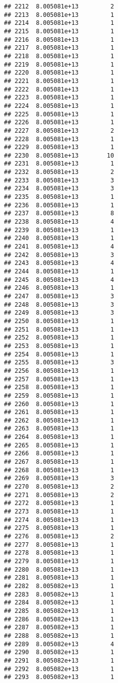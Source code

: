 \documentclass[
]{article}
\begin{document}
\begin{verbatim}
## 2212  8.005081e+13         2
## 2213  8.005081e+13         1
## 2214  8.005081e+13         1
## 2215  8.005081e+13         1
## 2216  8.005081e+13         1
## 2217  8.005081e+13         1
## 2218  8.005081e+13         1
## 2219  8.005081e+13         1
## 2220  8.005081e+13         1
## 2221  8.005081e+13         1
## 2222  8.005081e+13         1
## 2223  8.005081e+13         1
## 2224  8.005081e+13         1
## 2225  8.005081e+13         1
## 2226  8.005081e+13         1
## 2227  8.005081e+13         2
## 2228  8.005081e+13         1
## 2229  8.005081e+13         1
## 2230  8.005081e+13        10
## 2231  8.005081e+13         1
## 2232  8.005081e+13         2
## 2233  8.005081e+13         3
## 2234  8.005081e+13         3
## 2235  8.005081e+13         1
## 2236  8.005081e+13         1
## 2237  8.005081e+13         8
## 2238  8.005081e+13         4
## 2239  8.005081e+13         1
## 2240  8.005081e+13         1
## 2241  8.005081e+13         4
## 2242  8.005081e+13         3
## 2243  8.005081e+13         4
## 2244  8.005081e+13         1
## 2245  8.005081e+13         4
## 2246  8.005081e+13         1
## 2247  8.005081e+13         3
## 2248  8.005081e+13         3
## 2249  8.005081e+13         3
## 2250  8.005081e+13         1
## 2251  8.005081e+13         1
## 2252  8.005081e+13         1
## 2253  8.005081e+13         1
## 2254  8.005081e+13         1
## 2255  8.005081e+13         3
## 2256  8.005081e+13         1
## 2257  8.005081e+13         1
## 2258  8.005081e+13         1
## 2259  8.005081e+13         1
## 2260  8.005081e+13         1
## 2261  8.005081e+13         1
## 2262  8.005081e+13         1
## 2263  8.005081e+13         1
## 2264  8.005081e+13         1
## 2265  8.005081e+13         1
## 2266  8.005081e+13         1
## 2267  8.005081e+13         1
## 2268  8.005081e+13         1
## 2269  8.005081e+13         3
## 2270  8.005081e+13         2
## 2271  8.005081e+13         2
## 2272  8.005081e+13         1
## 2273  8.005081e+13         1
## 2274  8.005081e+13         1
## 2275  8.005081e+13         1
## 2276  8.005081e+13         2
## 2277  8.005081e+13         1
## 2278  8.005081e+13         1
## 2279  8.005081e+13         1
## 2280  8.005081e+13         1
## 2281  8.005081e+13         1
## 2282  8.005082e+13         1
## 2283  8.005082e+13         1
## 2284  8.005082e+13         1
## 2285  8.005082e+13         1
## 2286  8.005082e+13         1
## 2287  8.005082e+13         1
## 2288  8.005082e+13         1
## 2289  8.005082e+13         4
## 2290  8.005082e+13         1
## 2291  8.005082e+13         1
## 2292  8.005082e+13         1
## 2293  8.005082e+13         1

\end{verbatim}
\end{document}
